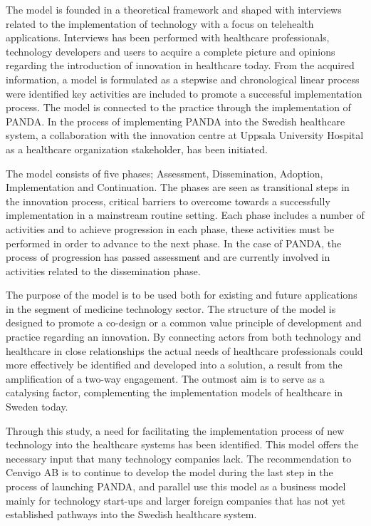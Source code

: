 \begin{small}
\begin{enumerate}
The model is founded in a theoretical framework and shaped with interviews related to the implementation of technology with a focus on telehealth applications. Interviews has been performed with healthcare professionals, technology developers and users to acquire a complete picture and opinions regarding the introduction of innovation in healthcare today. From the acquired information, a model is formulated as a stepwise and chronological linear process were identified key activities are included to promote a successful implementation process. The model is connected to the practice through the implementation of PANDA. In the process of implementing PANDA into the Swedish healthcare system, a collaboration with the innovation centre at Uppsala University Hospital as a healthcare organization stakeholder, has been initiated.

The model consists of five phases; Assessment, Dissemination, Adoption, Implementation and Continuation. The phases are seen as transitional steps in the innovation process, critical barriers to overcome towards a successfully implementation in a mainstream routine setting. Each phase includes a number of activities and to achieve progression in each phase, these activities must be performed in order to advance to the next phase. In the case of PANDA, the process of progression has passed assessment and are currently involved in activities related to the dissemination phase.

The purpose of the model is to be used both for existing and future applications in the segment of medicine technology sector. The structure of the model is designed to promote a co-design or a common value principle of development and practice regarding an innovation. By connecting actors from both technology and healthcare in close relationships the actual needs of healthcare professionals could more effectively be identified and developed into a solution, a result from the amplification of a two-way engagement. The outmost aim is to serve as a catalysing factor, complementing the implementation models of healthcare in Sweden today.

Through this study, a need for facilitating the implementation process of new technology into the healthcare systems has been identified. This model offers the necessary input that many technology companies lack. The recommendation to Cenvigo AB is to continue to develop the model during the last step in the process of launching PANDA, and parallel use this model as a business model mainly for technology start-ups and larger foreign companies that has not yet established pathways into the Swedish healthcare system.


\end{enumerate}
\end{small}
